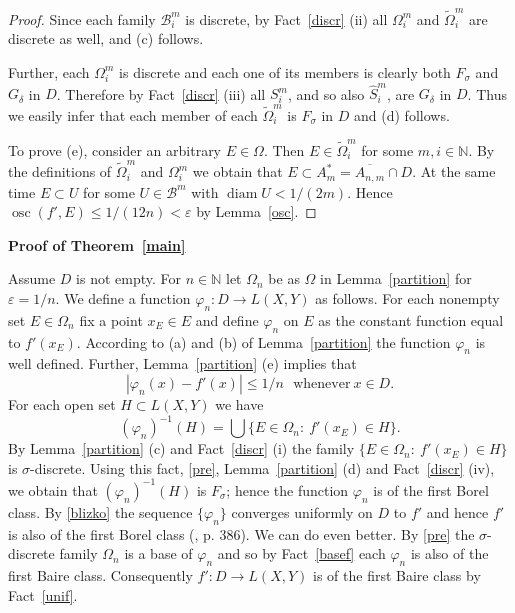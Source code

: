 \documentclass[12pt,a4paper]{amsart}
\theoremstyle{plain}
\theoremstyle{definition}
\theoremstyle{remark}
\numberwithin{equation}{section}
\newcommand{\N}{{\mathbb N}}
\newcommand{\osc}{\operatorname{osc}}
\newcommand{\ep}{\varepsilon}
\newcommand{\vf}{\varphi}
\newcommand{\diam}{\operatorname{diam}}
\newcommand{\B}{{\mathcal{B}}}
\begin{document}
\begin{proof}
Since each family $\B_i^m$ is discrete,  by Fact~\ref{discr} (ii) all  $\Omega_i^m$ and $\tilde \Omega_i^m$ 
are 
 discrete as well, and  (c) follows.

Further,  each $\Omega_i^m$ is discrete and each one of  its members is clearly both $F_{\sigma}$
 and $G_{\delta}$ in $D$. Therefore by   Fact~\ref{discr} (iii) all $S_i^m$, and so also  $\hat S_i^m$,
 are $G_{\delta}$ in $D$. Thus we easily infer that each member of each $\tilde \Omega_i^m$ is
$F_{\sigma}$ in $D$ and (d) follows.

 To prove (e), consider an arbitrary $E \in \Omega$. Then $E\in \tilde \Omega_i^m$ for some $m,i \in \N$.
 By the  definitions of $\tilde \Omega_i^m$ and $\Omega_i^m$ we obtain that 
$E \subset A^*_m = \overline{A_{n,m}} \cap D$. At the same time $E\subset U$ for some $U \in \B^m$ with $\diam U < 1/(2m)$.
Hence $\osc(f',E)  \leq  1/(12n) < \ep$ by
Lemma~\ref{osc}. 
\end{proof}




{\bf Proof of Theorem~\ref{main}}

Assume $D$ is not empty. For $n\in \N$ let $\Omega_n$ be as $\Omega$ in Lemma~\ref{partition} for $\varepsilon=1/n$. We define a function $\vf_n:D\to L(X,Y)$ as follows. For each nonempty set $E\in \Omega_n$ fix a point $x_E\in E$ and define $\vf_n$ on $E$ as the constant function equal to $f'(x_E)$. According to (a) and (b) of   Lemma~\ref{partition} the function $\vf_n$ is well defined. 
 Further, Lemma~\ref{partition} (e) implies that
\begin{equation}\label{blizko} 
 | \vf_n(x)-f'(x)|
 \leq 1/n\ \ \ \text{whenever}\   x \in D.
\end{equation}
For each open set $H \subset L(X,Y)$ we have
\begin{equation}\label{pre}
(\vf_n)^{-1} (H) = \bigcup \{E \in \Omega_n:\ f'(x_E) \in H\}. 
\end{equation}
  By   Lemma~\ref{partition} (c) and Fact~\ref{discr} (i) the family $\{E \in \Omega_n:\ f'(x_E) \in H\}$ is $\sigma$-discrete.
Using this fact, \eqref{pre}, Lemma~\ref{partition}  (d) and Fact~\ref{discr}  (iv), we obtain that
 $(\vf_n)^{-1} (H)$ is $F_{\sigma}$; hence
 the function $\vf_n$ is of the first Borel class.   By \eqref{blizko} the sequence $\{\vf_n\}$   
converges uniformly    on $D$ to $f'$ and hence $f'$ is also of the  first Borel class (\cite{K}, p. 386). We can do even better. By  \eqref{pre}  the $\sigma$-discrete family $\Omega_n$ is a base of
 $\vf_n$  and so by Fact~\ref{basef} each  $\vf_n$ is also of the first Baire class. Consequently 
   $f':D\to L(X,Y)$ is  of  the first Baire class  by Fact~\ref{unif}.
\end{document}
